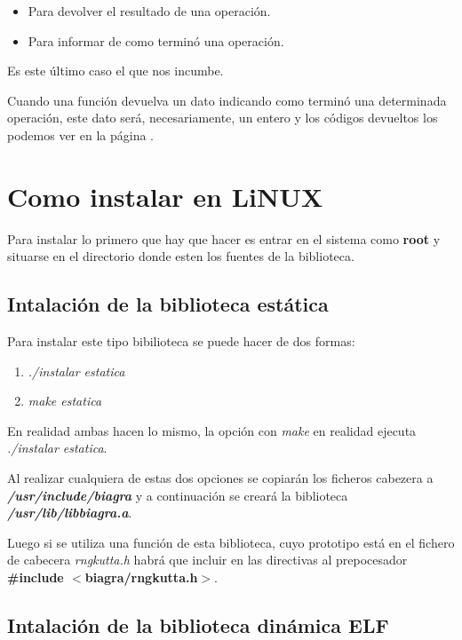 \begin{itemize}
\item Para devolver el resultado de una operaci\'on.
\item Para informar de como termin\'o una operaci\'on.
\end{itemize} 

Es este \'ultimo caso el que nos incumbe.\newline

Cuando una funci\'on devuelva un dato indicando como termin\'o una
determinada operaci\'on, este dato ser\'a, necesariamente, un entero y los
c\'odigos devueltos los podemos ver en la p\'agina \pageref{sec:tiposdecodigos}.

\section{Como instalar \BI en LiNUX}
Para instalar \BI lo primero que hay que hacer es entrar en el sistema
como \textbf{root} y situarse en el directorio donde esten los fuentes
de la biblioteca.

\subsection{Intalaci\'on de la biblioteca \BI est\'atica}
Para instalar este tipo bibilioteca se puede hacer de dos formas:

\begin{enumerate}
\item \emph{./instalar estatica}
\item \emph{make estatica}
\end{enumerate}

En realidad ambas hacen lo mismo, la opci\'on con \emph{make} en realidad 
ejecuta \emph{./instalar estatica}.\newline

Al realizar cualquiera de estas dos opciones se copiar\'an los ficheros
cabezera a \emph{\textbf{/usr/include/biagra}} y a continuaci\'on se crear\'a la
biblioteca\\ \emph{\textbf{/usr/lib/libbiagra.a}}.\newline

Luego si se utiliza una funci\'on de esta biblioteca, cuyo prototipo est\'a en 
el fichero de cabecera \emph{rngkutta.h} habr\'a que incluir en las directivas 
al prepocesador \textbf{\#include $<$biagra/rngkutta.h$>$}.

\newpage

\subsection{Intalaci\'on de la biblioteca \BI din\'amica ELF}

